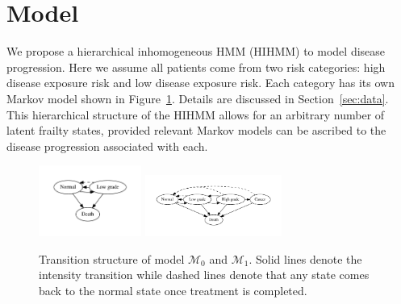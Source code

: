 \documentclass{article}
\begin{document}
\section{Model}
We propose a hierarchical inhomogeneous HMM (HIHMM) to model disease progression. Here we assume all patients come from two risk categories: high disease exposure risk and low disease exposure risk. Each category has its own Markov model shown in Figure~\ref{fig:HHMM}. Details are discussed in Section~\ref{sec:data}. This hierarchical structure of the HIHMM allows for an arbitrary number of latent frailty states, provided relevant Markov models can be ascribed to the disease progression associated with each. 

\begin{figure}[ht!]
	\centering
	\includegraphics[width = 0.3\textwidth]{pic/M0}
	\includegraphics[width = 0.4\textwidth]{pic/M1}
	\caption{Transition structure of model $\mathcal{M}_0$ and $\mathcal{M}_1$. Solid lines denote the intensity transition while dashed lines denote that any state comes back to the normal state once treatment is completed.}
	\label{fig:HHMM}
\end{figure}
\end{document}
